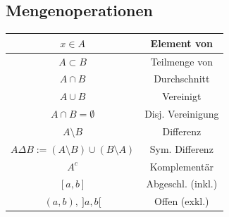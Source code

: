 \documentclass[8pt, a4paper, landscape, fleqn]{scrartcl}
\begin{document}
\begin{multicols*}{3}
		    \subsection{Mengenoperationen}
		        	\begin{tabular}{|c|c|}
						\hline
						$x\in A$ & Element von\\
						\hline
						$A\subset B$ &  Teilmenge von\\
						\hline
						$A\cap B$ & Durchschnitt\\
						\hline
						$A\cup B$ & Vereinigt \\
						\hline
						$A\cap B = \emptyset$ & Disj. Vereinigung \\
						\hline
						$A \setminus B$ & Differenz \\
						\hline
						$A \Delta B := (A \setminus B)\cup (B \setminus A)$ & Sym. Differenz \\
						\hline
						$A^c$ & Komplementär \\
						\hline
						$[a,b]$ & Abgeschl. (inkl.) \\
						\hline
						$(a,b), \ ]a,b[$ & Offen (exkl.) \\
						\hline
					\end{tabular}\\

\end{multicols*}
\end{document}
